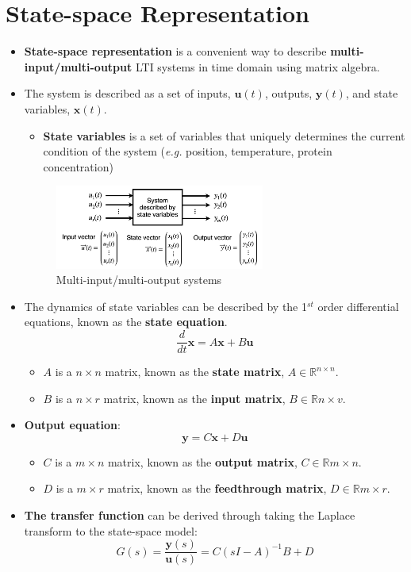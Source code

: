 \documentclass[12pt,a4paper]{article}
\begin{document}
\section{State-space Representation}
\begin{itemize}
  \item \textbf{State-space representation} is a convenient way to describe \textbf{multi-input/multi-output} LTI systems in time domain using matrix algebra.
  \item The system is described as a set of inputs, $\mathbf{u}(t)$, outputs, $\mathbf{y}(t)$, and state variables, $\mathbf{x}(t)$.
  \begin{itemize}
  \item \textbf{State variables} is a set of variables that uniquely determines the current condition of the system (\textit{e.g.} position, temperature, protein concentration)
  \end{itemize}

\begin{figure}[H] \centering
\includegraphics[width=0.65\textwidth]{images/multi_io.png}
\caption{Multi-input/multi-output systems}
\end{figure}

  \item The dynamics of state variables can be described by the 1$^{st}$ order differential equations, known as the \textbf{state equation}.
\[\frac{d}{dt}\mathbf{x} = A\mathbf{x}+B\mathbf{u}\]
  \begin{itemize}
    \item $A$ is a $n\times n$ matrix, known as the \textbf{state matrix}, $ A \in \mathbb{R}^{n\times n}$.
    \item $B$ is a $n \times r$ matrix, known as the \textbf{input matrix}, $B \in \mathbb{R}{n\times v}$.
  \end{itemize}
  \item \textbf{Output equation}: 
   \[\mathbf{y} = C\mathbf{x}+D\mathbf{u}\]
  \begin{itemize}
    \item $C$ is a $m\times n$ matrix, known as the \textbf{output matrix}, $ C \in \mathbb{R}{m\times n}$.
    \item $D$ is a $m \times r$ matrix, known as the \textbf{feedthrough matrix}, $D \in \mathbb{R}{m\times r}$.
  \end{itemize}
  \item \textbf{The transfer function} can be derived through taking the Laplace transform to the state-space model:
  \[G(s) = \frac{\mathbf{y}(s)}{\mathbf{u}(s)} = C(sI-A)^{-1}B+D\]
\end{itemize}
\end{document}
